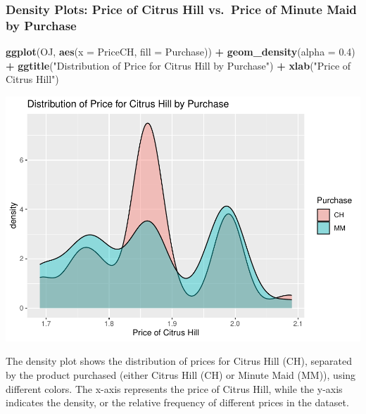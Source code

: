 \documentclass[
]{article}
\newenvironment{Shaded}{\begin{snugshade}}{\end{snugshade}}
\newcommand{\AttributeTok}[1]{\textcolor[rgb]{0.13,0.29,0.53}{#1}}
\newcommand{\FloatTok}[1]{\textcolor[rgb]{0.00,0.00,0.81}{#1}}
\newcommand{\FunctionTok}[1]{\textcolor[rgb]{0.13,0.29,0.53}{\textbf{#1}}}
\newcommand{\NormalTok}[1]{#1}
\newcommand{\SpecialCharTok}[1]{\textcolor[rgb]{0.81,0.36,0.00}{\textbf{#1}}}
\newcommand{\StringTok}[1]{\textcolor[rgb]{0.31,0.60,0.02}{#1}}
\begin{document}
\hypertarget{density-plots-price-of-citrus-hill-vs.-price-of-minute-maid-by-purchase}{%
\subsubsection{Density Plots: Price of Citrus Hill vs.~Price of Minute
Maid by
Purchase}\label{density-plots-price-of-citrus-hill-vs.-price-of-minute-maid-by-purchase}}

\begin{Shaded}
\begin{Highlighting}[]
\FunctionTok{ggplot}\NormalTok{(OJ, }\FunctionTok{aes}\NormalTok{(}\AttributeTok{x =}\NormalTok{ PriceCH, }\AttributeTok{fill =}\NormalTok{ Purchase)) }\SpecialCharTok{+}
  \FunctionTok{geom\_density}\NormalTok{(}\AttributeTok{alpha =} \FloatTok{0.4}\NormalTok{) }\SpecialCharTok{+}
  \FunctionTok{ggtitle}\NormalTok{(}\StringTok{"Distribution of Price for Citrus Hill by Purchase"}\NormalTok{) }\SpecialCharTok{+}
  \FunctionTok{xlab}\NormalTok{(}\StringTok{"Price of Citrus Hill"}\NormalTok{)}
\end{Highlighting}
\end{Shaded}

\includegraphics{OJ_files/figure-latex/unnamed-chunk-5-1.pdf}

The density plot shows the distribution of prices for Citrus Hill (CH),
separated by the product purchased (either Citrus Hill (CH) or Minute
Maid (MM)), using different colors. The x-axis represents the price of
Citrus Hill, while the y-axis indicates the density, or the relative
frequency of different prices in the dataset.
\end{document}
